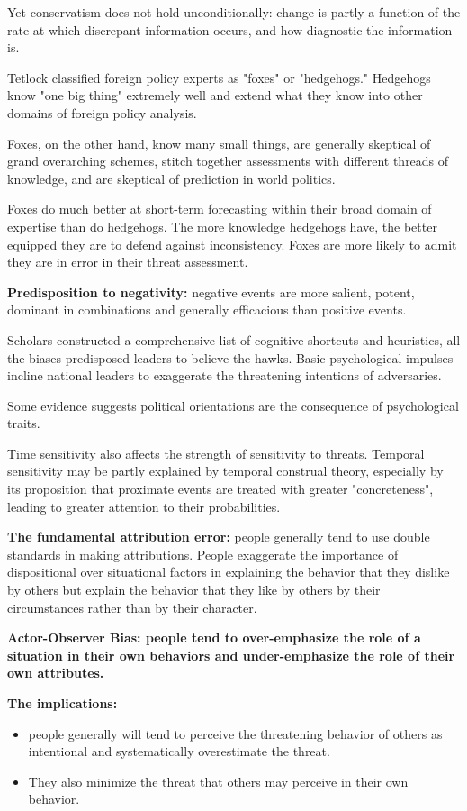 Yet conservatism does not hold unconditionally: change is partly a function of the rate at which discrepant information occurs, and how diagnostic the information is.

Tetlock classified foreign policy experts
as "foxes" or "hedgehogs."
Hedgehogs know "one big thing" extremely well and extend what they know into
other domains of foreign policy analysis.

Foxes, on the other hand, know many small things, are generally
skeptical of grand overarching schemes, stitch together assessments with different threads of knowledge, and
are skeptical of prediction in world politics.

Foxes do much better at short-term forecasting within their broad domain of expertise than do hedgehogs. The more knowledge hedgehogs have, the better equipped they are to defend against inconsistency. Foxes are more likely to admit they are in error in their threat assessment.

\textbf{Predisposition to negativity:} negative events are more salient, potent, dominant in combinations and generally efficacious than positive events.

Scholars constructed a comprehensive list of cognitive shortcuts and heuristics, all the biases predisposed leaders to believe the hawks. Basic psychological impulses incline national leaders to exaggerate the threatening intentions of adversaries.

Some evidence suggests political orientations are the consequence of psychological traits.

Time sensitivity also affects the strength of sensitivity to threats. Temporal sensitivity may be partly explained by temporal construal theory, especially by its proposition that proximate events are treated with greater "concreteness", leading to greater attention to their probabilities.

\textbf{The fundamental attribution error:} people generally tend to use double standards in making attributions. People exaggerate the importance of dispositional over situational factors in explaining the behavior that they dislike by others but explain the behavior that they like by others by their circumstances rather than by their character.

\textbf{Actor-Observer Bias: people tend to over-emphasize the role of a situation in their own behaviors and under-emphasize the role of their own attributes.}

\textbf{The implications:}
\begin{itemize}
    \item people generally will tend to perceive the threatening behavior of others as intentional and systematically overestimate the threat.
    \item They also minimize the threat that others may perceive in their own behavior.
\end{itemize}


